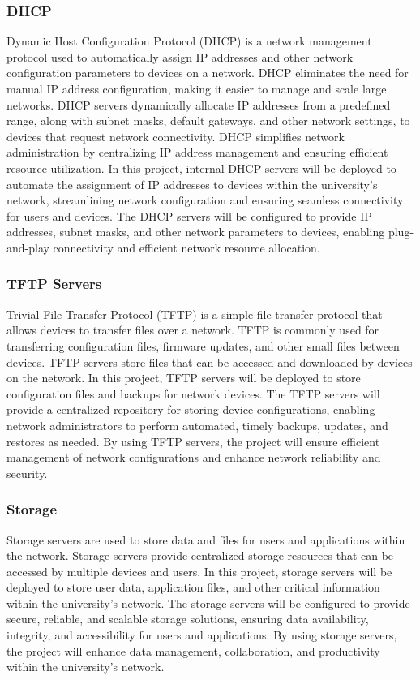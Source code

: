 \documentclass[12pt]{report}
\begin{document}
\subsubsection{DHCP}
Dynamic Host Configuration Protocol (DHCP) is a network management protocol used to automatically assign IP addresses and other network configuration parameters to devices on a network. DHCP eliminates the need for manual IP address configuration, making it easier to manage and scale large networks. DHCP servers dynamically allocate IP addresses from a predefined range, along with subnet masks, default gateways, and other network settings, to devices that request network connectivity. DHCP simplifies network administration by centralizing IP address management and ensuring efficient resource utilization. In this project, internal DHCP servers will be deployed to automate the assignment of IP addresses to devices within the university's network, streamlining network configuration and ensuring seamless connectivity for users and devices. The DHCP servers will be configured to provide IP addresses, subnet masks, and other network parameters to devices, enabling plug-and-play connectivity and efficient network resource allocation. \cite{DHCP}
\subsubsection{TFTP Servers}
Trivial File Transfer Protocol (TFTP) is a simple file transfer protocol that allows devices to transfer files over a network. TFTP is commonly used for transferring configuration files, firmware updates, and other small files between devices. TFTP servers store files that can be accessed and downloaded by devices on the network. In this project, TFTP servers will be deployed to store configuration files and backups for network devices. The TFTP servers will provide a centralized repository for storing device configurations, enabling network administrators to perform automated, timely backups, updates, and restores as needed. By using TFTP servers, the project will ensure efficient management of network configurations and enhance network reliability and security. \cite{TFTP}
\subsubsection{Storage}
Storage servers are used to store data and files for users and applications within the network. Storage servers provide centralized storage resources that can be accessed by multiple devices and users. In this project, storage servers will be deployed to store user data, application files, and other critical information within the university's network. The storage servers will be configured to provide secure, reliable, and scalable storage solutions, ensuring data availability, integrity, and accessibility for users and applications. By using storage servers, the project will enhance data management, collaboration, and productivity within the university's network.
\end{document}

